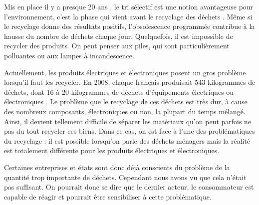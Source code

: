 \bigbreak
Mis en place il y a presque 20 ans , le tri sélectif est une notion avantageuse pour l’environnement, c'est la phase qui vient avant le recyclage des déchets \cite{tri}. Même si le recyclage donne des résultats positifs, l’obsolescence programmée contribue à la hausse du nombre de déchets chaque jour. Quelquefois, il est impossible de recycler des produits. On peut penser aux piles, qui sont particulièrement polluantes ou aux lampes à incandescence.

Actuellement, les produits électriques et électroniques posent un gros problème lorsqu'il faut les recycler. En 2008, chaque français produisait 543 kilogrammes de déchets, dont 16 à 20 kilogrammes de déchets d’équipements électriques ou électroniques \cite{opSsg}. Le problème que le recyclage de ces déchets est très dur, à cause des nombreux composants, électroniques ou non, la plupart du temps mélangé. Ainsi, il devient tellement difficile de séparer les matériaux qu'on peut parfois ne pas du tout recycler ces biens. Dans ce cas, on est face à l'une des problématiques du recyclage : il est possible lorsqu'on parle des déchets ménagers mais la réalité est totalement différente pour les produits électriques et électroniques. 


\bigbreak
Certaines entreprises et états sont donc déjà conscients du problème de la quantité trop importante de déchets. Cependant nous avons vu que cela n'était pas suffisant. On pourrait donc se dire que le dernier acteur, le consommateur est capable de réagir et pourrait être sensibiliser à cette problématique.